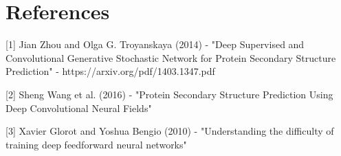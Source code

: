 \documentclass{article}
\begin{document}




%


\section*{References}

[1] Jian Zhou and Olga G. Troyanskaya (2014) - "Deep Supervised and Convolutional Generative Stochastic Network for Protein Secondary Structure Prediction" 
- https://arxiv.org/pdf/1403.1347.pdf

[2] Sheng Wang et al. (2016) - "Protein Secondary Structure Prediction Using Deep Convolutional Neural Fields"

[3] Xavier Glorot and Yoshua Bengio (2010) - "Understanding the difficulty of training deep feedforward neural networks"


%
%
\end{document}
